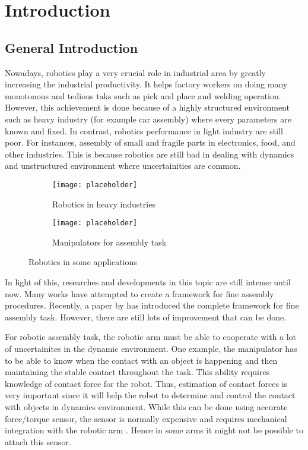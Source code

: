 \chapter{Introduction}
\section{General Introduction}

Nowadays, robotics play a very crucial role in industrial area by greatly increasing the industrial productivity. It helps factory workers on doing many monotonous and tedious taks such as pick and place and welding operation. However, this achievement is done because of a highly structured environment such as heavy industry (for example car assembly) where every parameters are known and fixed. In contrast, robotics performance in light industry are still poor. For instances, assembly of small and fragile parts in electronics, food, and other industries. This is because robotics are still bad in dealing with dynamics and unstructured environment where uncertainities are common. 

\begin{figure}[h]
  \begin{subfigure}[t]{0.5\textwidth}
    \texttt{[image: placeholder]} 
    \caption{Robotics in heavy industries}
  \end{subfigure}
  \begin{subfigure}[t]{0.5\textwidth}{
    \texttt{[image: placeholder]}
    \caption{Manipulators for assembly task}}
  \end{subfigure}
  \caption{Robotics in some applications}
\end{figure}


In light of this, researches and developments in this topic are still intense until now. Many works have attempted to create a framework for fine assembly procedures. Recently, a paper by \cite{aaaa} has introduced the complete framework for fine assembly task. However, there are still lots of improvement that can be done.


For robotic assembly task, the robotic arm must be able to cooperate with a lot of uncertainites in the dynamic environment. One example, the manipulator has to be able to know when the contact with an object is happening and then maintaining the stable contact throughout the task. This ability requires knowledge of contact force for the robot. Thus, estimation of contact forces is very important since it will help the robot to determine and control the contact with objects in dynamics environment. While this can be done using accurate force/torque sensor, the sensor is normally expensive and requires mechanical integration with the robotic arm \cite{Hao15}. Hence in some arms it might not be possible to attach this sensor.  
 

